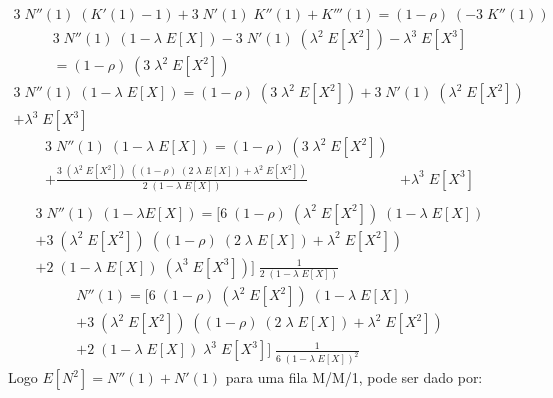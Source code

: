 \documentclass[a4paper]{article}
\newcommand{\E}[1]{E\!\left[#1\right]}
\begin{document}
\begin{align*}
    3 \; N''(1) \; (K'(1) - 1)
        + 3 \; N'(1) \; K''(1) + K'''(1)
        = (1 - \rho) \; (-3 \; K''(1))
\end{align*} \begin{align*}
    3 \; N''(1) \; (1 - \lambda \; \E{X})
        - 3 \; N'(1) \; (\lambda^2 \; \E{X^2})
        - \lambda^3 \; \E{X^3} \\
        = (1 - \rho) \; (3 \; \lambda^2 \; \E{X^2})
\end{align*} \begin{align*}
    3 \; N''(1) \; (1 - \lambda \; \E{X})
        = (1 - \rho) \; (3 \; \lambda^2 \; \E{X^2})
        + 3 \; N'(1) \; (\lambda^2 \; \E{X^2}) \\
        + \lambda^3 \; \E{X^3}
\end{align*} \begin{align*}
    3 \; N''(1) \; (1 - \lambda \; \E{X})
        = (1 - \rho) \; (3 \; \lambda^2 \; \E{X^2}) \\
        + \frac{3 \; (\lambda^2 \; \E{X^2}) \;
            ((1 - \rho) \; (2 \; \lambda \; \E{X})
        + \lambda^2 \; \E{X^2})}{2 \; (1 - \lambda \; \E{X})}
        &+ \lambda^3 \; \E{X^3} \\
\end{align*} \begin{align*}
    3 \; N''(1) \; (1 - \lambda \E{X})
        = \biggl[
            6 \; (1 - \rho) \; (\lambda^2 \; \E{X^2})
                \; (1 - \lambda \; \E{X}) \\
            + 3 \; (\lambda^2 \; \E{X^2}) \; ((1 - \rho)
                \; (2 \; \lambda \; \E{X}) + \lambda^2 \; \E{X^2}) \\
            + 2 \; (1 - \lambda \; \E{X}) \; (\lambda^3 \; \E{X^3})
        \biggr]
        \; \frac{1}{2 \; (1 - \lambda \; \E{X})}
\end{align*} \begin{align*}
    N''(1) = \biggl[
        6 \; (1 - \rho) \; (\lambda^2 \; \E{X^2})
            \; (1 - \lambda \; \E{X}) \\
        + 3 \; (\lambda^2 \; \E{X^2})
            \; ((1 - \rho) \; (2 \; \lambda \; \E{X})
        + \lambda^2 \; \E{X^2}) \\
        + 2 \; (1 - \lambda \; \E{X}) \; \lambda^3 \; \E{X^3}
    \biggr]
    \; \frac{1}{6 \; (1 - \lambda \; \E{X})^2}
\end{align*}
Logo \(\E{N^2} = N''(1) + N'(1)\)
para uma fila M/M/1, pode ser dado por:
\end{document}

